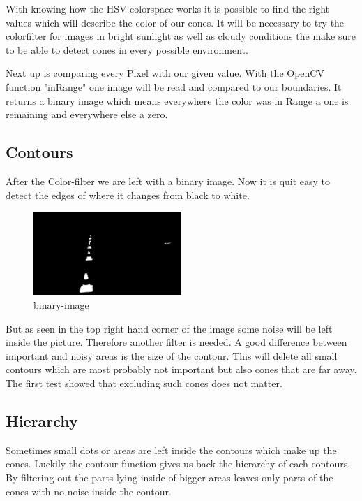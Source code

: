 \documentclass[10pt,a4paper]{article}
\begin{document}
	With knowing how the HSV-colorspace works it is possible to find the right values which will describe the color of our cones. It will be necessary to try the colorfilter for images in bright sunlight as well as cloudy conditions the make sure to be able to detect cones in every possible environment.
	
	Next up is comparing every Pixel with our given value. With the OpenCV function "inRange" one image will be read and compared to our boundaries. It returns a binary image which means everywhere the color was in Range a one is remaining and everywhere else a zero.
	
	\subsection{Contours}
	After the Color-filter we are left with a binary image. Now it is quit easy to detect the edges of where it changes from black to white.
	
	\begin{figure}[h]
		\centering
		\includegraphics[width=0.5\textwidth]{Abb/mask.png}
		\caption{binary-image}
		\label{binary-image}
	\end{figure}
	
	But as seen in the top right hand corner of the image some noise will be left inside the picture. Therefore another filter is needed. A good difference between important and noisy areas is the size of the contour. This will delete all small contours which are most probably not important but also cones that are far away. The first test showed that excluding such cones does not matter.
	
	\subsection{Hierarchy}
	Sometimes small dots or areas are left inside the contours which make up the cones. Luckily the contour-function gives us back the hierarchy of each contours. By filtering out the parts lying inside of bigger areas leaves only parts of the cones with no noise inside the contour.
	
\end{document}
